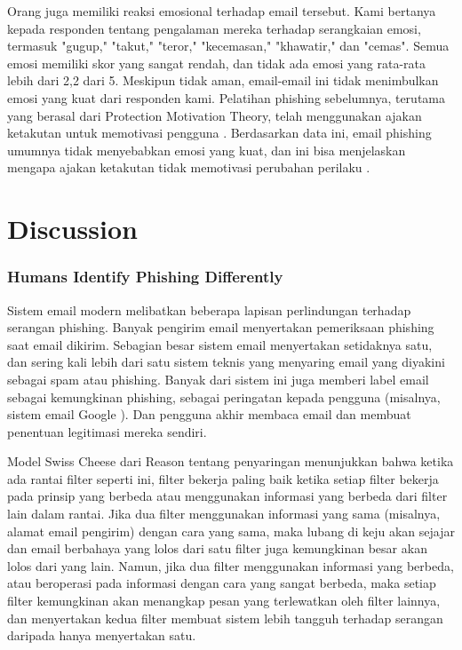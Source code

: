 \documentclass[lettersize,journal]{IEEEtran}
\begin{document}
Orang juga memiliki reaksi emosional terhadap email tersebut. Kami bertanya
kepada responden tentang pengalaman mereka terhadap serangkaian emosi, termasuk
"gugup," "takut," "teror," "kecemasan," "khawatir," dan "cemas". Semua emosi
memiliki skor yang sangat rendah, dan tidak ada emosi yang rata-rata lebih dari
2,2 dari 5. Meskipun tidak aman, email-email ini tidak menimbulkan emosi yang
kuat dari responden kami. Pelatihan phishing sebelumnya, terutama yang berasal
dari Protection Motivation Theory, telah menggunakan ajakan ketakutan untuk
memotivasi pengguna \cite{lima,duanol}. Berdasarkan data ini, email phishing
umumnya tidak menyebabkan emosi yang kuat, dan ini bisa menjelaskan mengapa
ajakan ketakutan tidak memotivasi perubahan perilaku \cite{enam}.

\section{Discussion}

\subsubsection{Humans Identify Phishing Differently}
Sistem email modern melibatkan beberapa lapisan perlindungan terhadap serangan
phishing. Banyak pengirim email menyertakan pemeriksaan phishing saat email
dikirim. Sebagian besar sistem email menyertakan setidaknya satu, dan sering
kali lebih dari satu sistem teknis yang menyaring email yang diyakini sebagai
spam atau phishing. Banyak dari sistem ini juga memberi label email sebagai
kemungkinan phishing, sebagai peringatan kepada pengguna (misalnya, sistem
email Google \cite{dualima}). Dan pengguna akhir membaca email dan membuat
penentuan legitimasi mereka sendiri.

Model Swiss Cheese dari Reason tentang penyaringan \cite{duadelapan}
menunjukkan bahwa ketika ada rantai filter seperti ini, filter bekerja paling
baik ketika setiap filter bekerja pada prinsip yang berbeda atau menggunakan
informasi yang berbeda dari filter lain dalam rantai. Jika dua filter
menggunakan informasi yang sama (misalnya, alamat email pengirim) dengan cara
yang sama, maka lubang di keju akan sejajar dan email berbahaya yang lolos dari
satu filter juga kemungkinan besar akan lolos dari yang lain. Namun, jika dua
filter menggunakan informasi yang berbeda, atau beroperasi pada informasi
dengan cara yang sangat berbeda, maka setiap filter kemungkinan akan menangkap
pesan yang terlewatkan oleh filter lainnya, dan menyertakan kedua filter
membuat sistem lebih tangguh terhadap serangan daripada hanya menyertakan satu.
\end{document}
